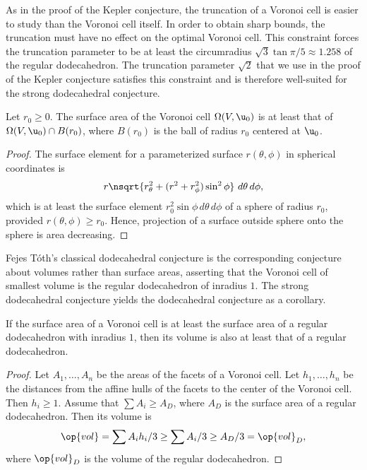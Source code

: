 \begin{remark}
As in the proof of the Kepler conjecture, the truncation of a Voronoi cell is easier
to study than the Voronoi cell itself.  In order to obtain sharp bounds, the truncation
must have no effect on the optimal Voronoi cell.  This constraint forces the
 truncation parameter to be at least
the circumradius $\sqrt{3}\tan{\pi/5}\approx 1.258$ of the regular dodecahedron.   The truncation parameter $\sqrt{2}$
that we use in the proof of the Kepler conjecture satisfies this constraint and is
therefore  well-suited for the strong dodecahedral
conjecture.
\end{remark}

\begin{lemma}[] Let $r_0\ge0$.  %
  The surface area of the Voronoi cell $\Omega(V, \u_0)$ is at least
  that of $\Omega(V, \u_0)\cap B(r_0)$, where $B(r_0)$ is the ball of radius
  $r_0$ centered at $ \u_0$.  
\end{lemma}
%


\begin{proof} The surface element for a parameterized surface
  $r(\theta,\phi)$ in spherical coordinates is
\[
%
  r \nsqrt{r_\theta^2 + (r^2 + r_\phi^2)\sin^2\phi } \,\,d\theta\,d\phi,
\]
which is at least the surface element $r_0^2 \sin\phi\, d\theta\,d\phi$
of a sphere of radius $r_0$, provided
$r(\theta,\phi)\ge r_0$.   Hence, projection of a surface outside
sphere onto the sphere is area decreasing.
\end{proof}


Fejes T\'oth's classical dodecahedral conjecture is the corresponding conjecture
about volumes rather than surface areas, asserting that  the
Voronoi cell of smallest volume is the regular dodecahedron of
inradius $1$.  %
The strong dodecahedral conjecture yields the dodecahedral conjecture
as a corollary.

\begin{lemma}[]
  If the surface area of a Voronoi cell is at least the surface area
  of a regular dodecahedron with inradius $1$, then its volume is also
   at least that  of a regular dodecahedron.
\end{lemma}

\begin{proof} Let $A_1,\ldots,A_n$ be the areas of the facets of a
  Voronoi cell.  Let $h_1,\ldots,h_n$ be the distances from the affine
  hulls of the facets to the center of the Voronoi cell.  Then $h_i\ge
  1$.  Assume that $\sum A_i \ge A_D$, where $A_D$ is the surface area
  of a regular dodecahedron.  Then its volume is
\[
\op{vol} = \sum A_i h_i/3 \ge \sum A_i/3 \ge A_D/3 = \op{vol}_D,
\]
where $\op{vol}_D$ is the volume of the regular dodecahedron.
\end{proof}
%
%
%


